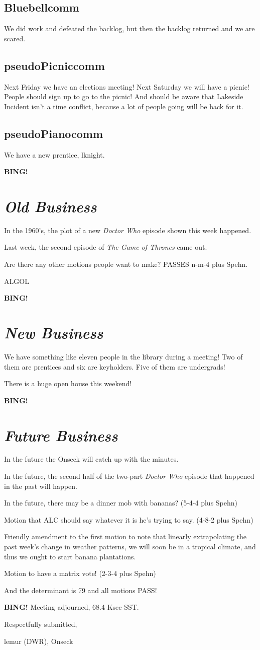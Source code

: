 \documentclass[10pt]{article}
\newcommand{\bing}{{\bf BING!} }
\newcommand{\goto}[1]{\bing \vskip 12pt \section*{{\em{#1}}}}
\newcommand{\ps}{ plus Spehn\xspace}
\newcommand{\onseck}{lemur (DWR), Onseck}
\begin{document}
\subsection*{Bluebellcomm}

We did work and defeated the backlog, but then the backlog returned and
we are scared.


\subsection*{pseudoPicniccomm}

Next Friday we have an elections meeting!  Next Saturday we will have
a picnic!  People should sign up to go to the picnic!  And should be 
aware that Lakeside Incident isn't a time conflict, because a lot of
people going will be back for it.


\subsection*{pseudoPianocomm}

We have a new prentice, lknight.


\goto{Old Business}

In the 1960's, the plot of a new \emph{Doctor Who} episode shown
this week happened.

Last week, the second episode of \emph{The Game of Thrones} came out.

Are there any other motions people want to make? PASSES n-m-4\ps.

ALGOL


\goto{New Business}

We have something like eleven people in the library during a meeting!  Two
of them are prentices and six are keyholders.  Five of them are undergrads!

There is a huge open house this weekend!


\goto{Future Business}

In the future the Onseck will catch up with the minutes.

In the future, the second half of the two-part \emph{Doctor Who}
episode that happened in the past will happen.

In the future, there may be a dinner mob with bananas?  (5-4-4\ps)

Motion that ALC should say whatever it is he's trying to say. (4-8-2\ps)

Friendly amendment to the first motion to note that linearly extrapolating
the past week's change in weather patterns, we will soon be in a tropical
climate, and thus we ought to start banana plantations.

Motion to have a matrix vote! (2-3-4\ps)

And the determinant is 79 and all motions PASS!

\bing
\noindent
Meeting adjourned, 68.4 Ksec SST.

\vspace{18pt}

\centerline{Respectfully submitted,}
\centerline{\onseck}
\end{document}
